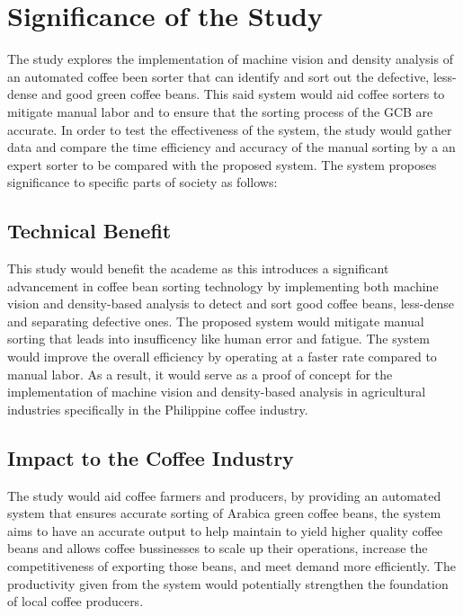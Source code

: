 \section{Significance of the Study}

The study explores the implementation of machine vision and density analysis of an automated coffee been sorter that can identify and sort out the defective, less-dense and good green coffee beans. This said system would aid coffee sorters to mitigate manual labor and to ensure that the sorting process of the GCB are accurate. In order to test the effectiveness of the system, the study would gather data and compare the time efficiency and accuracy of the manual sorting by a an expert sorter to be compared with the proposed system. The system proposes significance to specific parts of society as follows: 

\subsection{Technical Benefit}

This study would benefit the academe as this introduces a significant advancement in coffee bean sorting technology by implementing both machine vision and density-based analysis to detect and sort good coffee beans, less-dense and separating defective ones. The proposed system would mitigate manual sorting that leads into insufficency like human error and fatigue. The system would improve the overall efficiency by operating at a faster rate compared to manual labor. As a result, it would serve as a proof of concept for the implementation of machine vision and  density-based analysis in agricultural  industries specifically in the Philippine coffee industry. 

\subsection{Impact to the Coffee Industry}

The study would aid coffee farmers and producers, by providing an automated system that ensures accurate sorting of Arabica green coffee beans, the system aims to have an accurate output to help maintain to yield higher quality coffee beans and allows coffee bussinesses to scale up their operations, increase the competitiveness of  exporting those beans, and meet demand more efficiently. The productivity given from the system would potentially strengthen the foundation of local coffee producers.  

